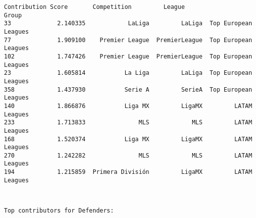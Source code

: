 \documentclass[11pt]{article}
\makeatletter
\newcommand{\boxspacing}{\kern\kvtcb@left@rule\kern\kvtcb@boxsep}
\newcommand{\prompt}[4]{
        {\ttfamily\llap{{\color{#2}[#3]:\hspace{3pt}#4}}\vspace{-\baselineskip}}
    }
\makeatother
\begin{document}
\begin{tcolorbox}[breakable, size=fbox, boxrule=.5pt, pad at break*=1mm, opacityfill=0]
\begin{Verbatim}[commandchars=\\\{\}]
     Contribution Score       Competition         League                 Group
33             2.140335            LaLiga         LaLiga  Top European Leagues
77             1.909100    Premier League  PremierLeague  Top European Leagues
102            1.747426    Premier League  PremierLeague  Top European Leagues
23             1.605814           La Liga         LaLiga  Top European Leagues
358            1.437930           Serie A         SerieA  Top European Leagues
140            1.866876           Liga MX         LigaMX         LATAM Leagues
233            1.713833               MLS            MLS         LATAM Leagues
168            1.520374           Liga MX         LigaMX         LATAM Leagues
270            1.242282               MLS            MLS         LATAM Leagues
194            1.215859  Primera División         LigaMX         LATAM Leagues
\end{Verbatim}
\end{tcolorbox}
        
    \begin{tcolorbox}[breakable, size=fbox, boxrule=1pt, pad at break*=1mm,colback=cellbackground, colframe=cellborder]
\prompt{In}{incolor}{49}{\boxspacing}
\begin{Verbatim}[commandchars=\\\{\}]

\end{Verbatim}
\end{tcolorbox}

    \begin{Verbatim}[commandchars=\\\{\}]

Top contributors for Defenders:
    \end{Verbatim}
\end{document}
